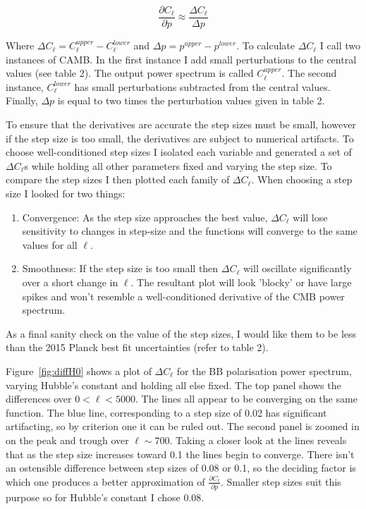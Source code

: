 \begin{equation}
\label{eqn:dcl}
\frac{\partial C_{\ell}}{\partial p} \approx \frac{\Delta C_{\ell}}{\Delta p}
\end{equation}
 
Where $\Delta C_{\ell} = C^{upper}_{\ell} - C^{lower}_{\ell}$ and $\Delta p = p^{upper} - p^{lower}$. To calculate $\Delta C_{\ell}$ I call two instances of CAMB. In the first instance I add small perturbations to the central values (see table 2). The output power spectrum is called $C^{upper}_{\ell}$. The second instance, $C^{lower}_{\ell}$ has small perturbations subtracted from the central values. Finally, $\Delta p$ is equal to two times the perturbation values given in table 2.

To ensure that the derivatives are accurate the step sizes must be small, however if the step size is too small, the derivatives are subject to numerical artifacts. To choose well-conditioned step sizes I isolated each variable and generated a set of $\Delta C_{\ell}$s while holding all other parameters fixed and varying the step size. To compare the step sizes I then plotted each family of $\Delta C_{\ell}$. When choosing a step size I looked for two things:

\begin{enumerate}
\item Convergence: As the step size approaches the best value, $\Delta C_{\ell}$ will lose sensitivity to changes in step-size and the functions will converge to the same values for all $\ell$.

\item Smoothness: If the step size is too small then $\Delta C_{\ell}$ will oscillate significantly over a short change in $\ell$. The resultant plot will look 'blocky' or have large spikes and won't resemble a well-conditioned derivative of the CMB power spectrum.
\end{enumerate}

As a final sanity check on the value of the step sizes, I would like them to be less than the 2015 Planck best fit uncertainties (refer to table 2).
 
Figure~\ref{fig:diffH0} shows a plot of $\Delta C_{\ell}$ for the BB polarisation power spectrum, varying Hubble's constant and holding all else fixed. The top panel shows the differences over $ 0 < \ell < 5000$. The lines all appear to be converging on the same function. The blue line, corresponding to a step size of 0.02 has significant artifacting, so by criterion one it can be ruled out. The second panel is zoomed in on the peak and trough over $\ell \sim 700$. Taking a closer look at the lines reveals that as the step size increases toward 0.1 the lines begin to converge. There isn't an ostensible difference between step sizes of 0.08 or 0.1, so the deciding factor is which one produces a better approximation of $\frac{\partial C_{\ell}}{\partial p}$. Smaller step sizes suit this purpose so for Hubble's constant I chose 0.08.
  
